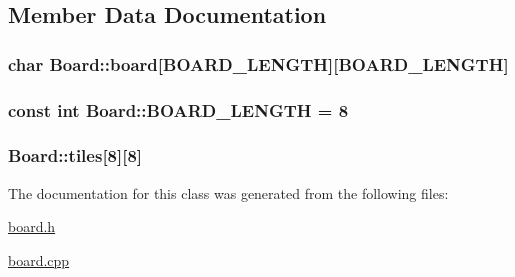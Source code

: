 \subsection{Member Data Documentation}
\hypertarget{class_board_a6e32218e7d8adc57f9d414836d135d96}{
\subsubsection[{board}]{\setlength{\rightskip}{0pt plus 5cm}char Board\-::board\mbox{[}{\bf B\-O\-A\-R\-D\-\_\-\-L\-E\-N\-G\-T\-H}\mbox{]}\mbox{[}{\bf B\-O\-A\-R\-D\-\_\-\-L\-E\-N\-G\-T\-H}\mbox{]}}}\label{class_board_a6e32218e7d8adc57f9d414836d135d96}
\hypertarget{class_board_a3b3d4827430812c8849610301dbf91f3}{
\subsubsection[{B\-O\-A\-R\-D\-\_\-\-L\-E\-N\-G\-T\-H}]{\setlength{\rightskip}{0pt plus 5cm}const int Board\-::\-B\-O\-A\-R\-D\-\_\-\-L\-E\-N\-G\-T\-H = 8\hspace{0.3cm}{\ttfamily [static]}}}\label{class_board_a3b3d4827430812c8849610301dbf91f3}
\hypertarget{class_board_acd3e1340f25b2d2371d8a2862e473b15}{
\subsubsection[{tiles}]{ Board\-::tiles\mbox{[}8\mbox{]}\mbox{[}8\mbox{]}}}\label{class_board_acd3e1340f25b2d2371d8a2862e473b15}


The documentation for this class was generated from the following files\-:\begin{DoxyCompactItemize}
\item 
\hyperlink{board_8h}{board.\-h}\item 
\hyperlink{board_8cpp}{board.\-cpp}\end{DoxyCompactItemize}
